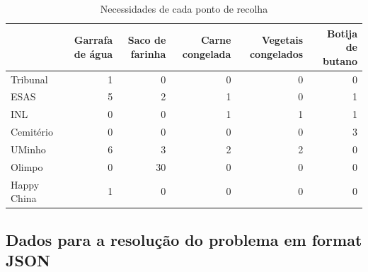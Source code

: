 \documentclass[12pt, a4paper, titlepage]{article}
\begin{document}
\begin{table}[H]
    \small

    \begin{adjustwidth}{-1.5cm}{-1.5cm}
        \begin{center}
            \begin{tabular}{|l|r|r|r|r|r|}
                \hline
                                    &
                Garrafa de água     &
                Saco de farinha     &
                Carne congelada     &
                Vegetais congelados &
                Botija de butano    \\

                \hline
                Tribunal & 1 & 0 & 0 & 0 & 0 \\
                \hline
                ESAS & 5 & 2 & 1 & 0 & 1 \\
                \hline
                INL & 0 & 0 & 1 & 1 & 1 \\
                \hline
                Cemitério & 0 & 0 & 0 & 0 & 3 \\
                \hline
                UMinho & 6 & 3 & 2 & 2 & 0 \\
                \hline
                Olimpo & 0 & 30 & 0 & 0 & 0 \\
                \hline
                Happy China & 1 & 0 & 0 & 0 & 0 \\
                \hline
            \end{tabular}
        \end{center}
    \end{adjustwidth}

    \caption{Necessidades de cada ponto de recolha}
\end{table}

\subsection{Dados para a resolução do problema em format JSON}
\label{problem-data-json}


\end{document}
